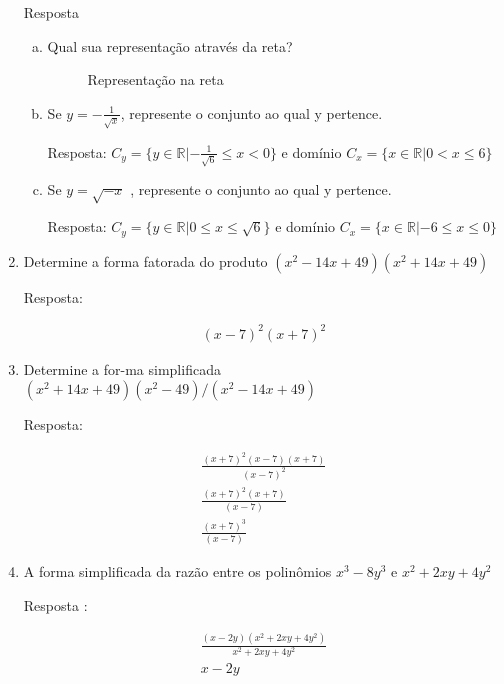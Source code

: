 \documentclass[12pt,onepage,a4paper]{memoir}
\begin{document}
\begin{enumerate}
Resposta

       \begin{enumerate}[a)]
       \item  Qual sua representação através da reta?


         \begin{figure}[h]
           \centering
           \caption{Representação na reta}
         \end{figure}


       \item  Se $y = -\frac{1}{\sqrt{x}}$, represente o conjunto ao qual y pertence.

         Resposta: $C_y = \{y \in \mathbb{R} |  -\frac{1}{\sqrt{6}} \leq x <
         0\}$  e domínio $C_x=\{ x \in \mathbb{R} | 0 < x \leq 6  \}$
         
       \item  Se $y = \sqrt{-x}$ , represente o conjunto ao qual y pertence.

Resposta: $C_y = \{y \in \mathbb{R} |  0 \leq x \leq \sqrt{6}\}$ e domínio $C_x=\{ x \in \mathbb{R} | -6 \leq x \leq 0  \}$        

\end{enumerate}



\item Determine a forma fatorada do produto $(x^2 - 14x + 49 )(x^2 + 14x + 49 )$

  Resposta:

  \begin{align}
    (x-7 )^2(x+7)^2
  \end{align}
  
\item Determine a for-ma simplificada $(x^2 + 14x + 49)( x^2 - 49)/(x^2 - 14x +  49)$
   
  Resposta:

  \begin{align}
    \frac{(x+7)^2(x-7)(x+7)}{(x-7)^2} \nonumber \\
    \frac{(x+7)^2(x+7)}{(x-7)}  \nonumber \\
    \frac{(x+7)^3}{(x-7)}
  \end{align}
\item  A forma simplificada da razão entre os polinômios $x^3 - 8y^3$ e $x^2 + 2xy + 4y^2$

  Resposta :

  \begin{align}
    \frac{(x-2y)(x^2 + 2xy + 4y^2)}{x^2 + 2xy + 4y^2} \nonumber \\
     x-2y
  \end{align}

 
  
\end{enumerate} %
\end{document}
